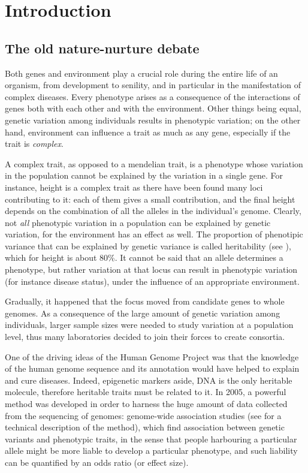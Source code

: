 \documentclass[../main.tex]{subfiles}
\begin{document}
\chapter{Introduction}

\section{The old nature-nurture debate}

Both genes and environment play a crucial role during the entire life of 
an organism, from development to senility, and in particular in the 
manifestation of complex diseases. Every phenotype arises as a 
consequence of the interactions of genes both with each other and with 
the environment. Other things being equal, genetic variation among 
individuals\cite{1000GenomesProjectConsortium2015} results in phenotypic 
variation; on the other hand, environment can influence a trait as much 
as any gene, especially if the trait is \textit{complex}.

A complex trait, as opposed to a mendelian trait, is a phenotype whose 
variation in the population cannot be explained by the variation in a 
single gene. For instance, height is a complex trait as there have been 
found many loci contributing to it: each of them gives a small 
contribution, and the final height depends on the combination of all the 
alleles in the individual's genome. Clearly, not \textit{all} phenotypic 
variation in a population can be explained by genetic variation, for the 
environment has an effect as well. The proportion of phenotipic variance 
that can be explained by genetic variance is called heritability (see 
), which for height is about 
80\%\cite{Visscher2008a}. It cannot be said that an allele determines a 
phenotype, but rather variation at that locus can result in phenotypic 
variation (for instance disease status), under the influence of an 
appropriate environment.

Gradually, it happened that the focus moved from candidate genes to 
whole genomes. As a consequence of the large amount of genetic variation 
among individuals, larger sample sizes were needed to study variation at 
a population level, thus many laboratories decided to join their forces 
to create consortia.

One of the driving ideas of the Human Genome 
Project\cite{Lander2001,Venter2001} was that the knowledge of the human 
genome sequence and its annotation would have helped to explain and cure 
diseases. Indeed, epigenetic markers aside, DNA is the only heritable 
molecule, therefore heritable traits must be related to it. In 2005, a 
powerful method was developed in order to harness the huge amount of 
data collected from the sequencing of genomes: genome-wide association 
studies (see  for a technical description of the method), 
which find association between genetic variants and phenotypic traits, 
in the sense that people harbouring a particular allele might be more 
liable to develop a particular phenotype, and such liability can be 
quantified by an odds ratio (or effect size).
\end{document}
